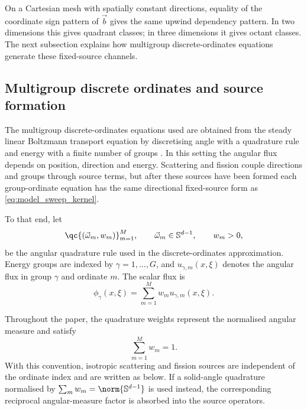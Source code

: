 \documentclass[final]{amsart}
\begin{document}
On a Cartesian mesh with spatially constant directions, equality of the
coordinate sign pattern of $\vec b$ gives the same upwind dependency
pattern. In two dimensions this gives quadrant classes; in three
dimensions it gives octant classes. The next subsection explains how
multigroup discrete-ordinates equations generate these fixed-source
channels.

\subsection{Multigroup discrete ordinates and source formation}

The multigroup discrete-ordinates equations used are obtained from the
steady linear Boltzmann transport equation by discretising angle with
a quadrature rule and energy with a finite number of groups
\cite{LewisMiller1984,AdamsLarsen2002,AndrsEtAl2026OpenSn}.  In this
setting the angular flux depends on position, direction and
energy. Scattering and fission couple directions and groups through
source terms, but after these sources have been formed each
group-ordinate equation has the same directional fixed-source form as
\eqref{eq:model_sweep_kernel}.

To that end, let
\begin{equation}
  \qc{(\vec\omega_m,w_m)}_{m=1}^{M},
  \qquad
  \vec\omega_m\in\mathbb{S}^{d-1},
  \qquad
  w_m>0,
  \label{eq:model_angular_quadrature}
\end{equation}
be the angular quadrature rule used in the discrete-ordinates
approximation. Energy groups are indexed by $\gamma=1,\dots,G$, and
$u_{\gamma,m}(x,\xi)$ denotes the angular flux in group $\gamma$ and
ordinate $m$. The scalar flux is
\begin{equation}
  \phi_\gamma(x,\xi)
  =
  \sum_{m=1}^{M}w_m u_{\gamma,m}(x,\xi).
  \label{eq:model_scalar_flux}
\end{equation}

Throughout the paper, the quadrature weights represent the normalised
angular measure and satisfy
\begin{equation}
\sum_{m=1}^{M}w_m=1.
\label{eq:model_angular_weight_normalisation}
\end{equation}
With this convention, isotropic scattering and fission sources are
independent of the ordinate index and are written as below. If a
solid-angle quadrature normalised by
$\sum_m w_m=\norm{\mathbb S^{d-1}}$ is used instead, the corresponding
reciprocal angular-measure factor is absorbed into the source
operators.
\end{document}
